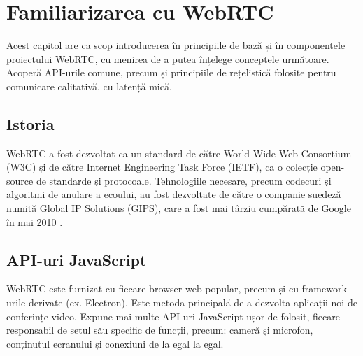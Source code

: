 
\chapter{Familiarizarea cu WebRTC}
\label{chap:ch2}

\indent \par Acest capitol are ca scop introducerea în principiile de bază și în componentele proiectului WebRTC, cu menirea de a putea înțelege conceptele următoare. Acoperă API-urile comune, precum și principiile de rețelistică folosite pentru comunicare calitativă, cu latență mică.

\section{Istoria}
\label{sec:ch2sec1}

\indent \par WebRTC a fost dezvoltat ca un standard de către World Wide Web Consortium (W3C) și de către Internet Engineering Task Force (IETF), ca o colecție open-source de standarde și protocoale. Tehnologiile necesare, precum codecuri și algoritmi de anulare a ecoului, au fost dezvoltate de către o companie suedeză numită Global IP Solutions (GIPS), care a fost mai târziu cumpărată de Google în mai 2010 \cite{WebNSM2017}.

\section{API-uri JavaScript}
\label{sec:ch2sec2}
\indent \par WebRTC este furnizat cu fiecare browser web popular, precum și cu framework-urile derivate (ex. Electron). Este metoda principală de a dezvolta aplicații noi de conferințe video. Expune mai multe API-uri JavaScript ușor de folosit, fiecare responsabil de setul său specific de funcții, precum: cameră și microfon, conținutul ecranului și conexiuni de la egal la egal.

